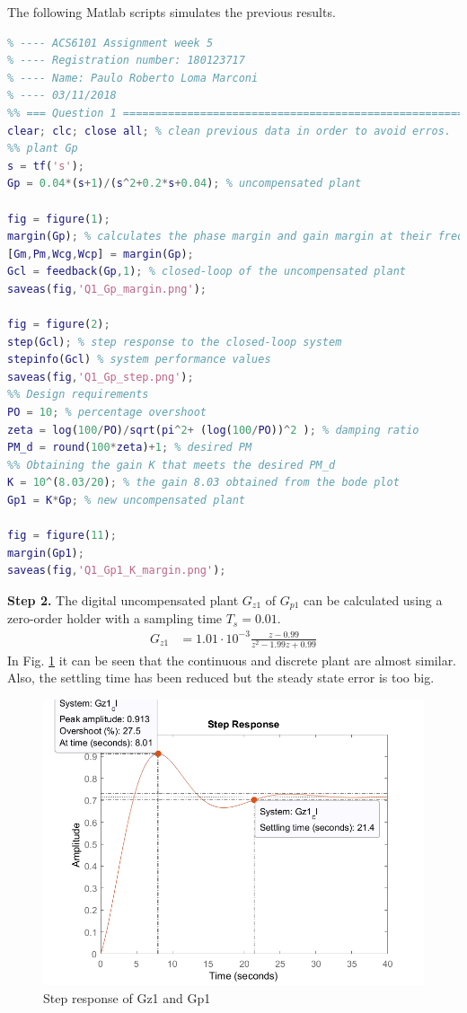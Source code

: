 \documentclass[11pt, a4paper]{article}
\begin{document}
The following Matlab scripts simulates the previous results.
\begin{lstlisting}[language=matlab, caption={}, label={}]
%% ========================================================================
% ---- ACS6101 Assignment week 5
% ---- Registration number: 180123717
% ---- Name: Paulo Roberto Loma Marconi
% ---- 03/11/2018
%% === Question 1 =========================================================
clear; clc; close all; % clean previous data in order to avoid erros.
%% plant Gp 
s = tf('s');
Gp = 0.04*(s+1)/(s^2+0.2*s+0.04); % uncompensated plant

fig = figure(1); 
margin(Gp); % calculates the phase margin and gain margin at their frequencies
[Gm,Pm,Wcg,Wcp] = margin(Gp);
Gcl = feedback(Gp,1); % closed-loop of the uncompensated plant
saveas(fig,'Q1_Gp_margin.png');

fig = figure(2);
step(Gcl); % step response to the closed-loop system
stepinfo(Gcl) % system performance values
saveas(fig,'Q1_Gp_step.png');
%% Design requirements
PO = 10; % percentage overshoot
zeta = log(100/PO)/sqrt(pi^2+ (log(100/PO))^2 ); % damping ratio
PM_d = round(100*zeta)+1; % desired PM
%% Obtaining the gain K that meets the desired PM_d
K = 10^(8.03/20); % the gain 8.03 obtained from the bode plot
Gp1 = K*Gp; % new uncompensated plant

fig = figure(11);
margin(Gp1);
saveas(fig,'Q1_Gp1_K_margin.png');
\end{lstlisting}

\textbf{Step 2.} The digital uncompensated plant $G_{z1}$ of $G_{p1}$ can be calculated using a zero-order holder with a sampling time $T_s=0.01$.
\begin{align}
G_{z1} &= 1.01\cdot10^{-3}\frac{z-0.99}{z^2-1.99z+0.99}
\end{align} 
In Fig. \ref{fig:Q1_Gz1_K_step} it can be seen that the continuous and discrete plant are almost similar. Also, the settling time has been reduced but the steady state error is too big.

\begin{figure}[H]
	\centering
	\includegraphics[width=0.48\linewidth]{../Q1_Gpz_K_step_a.png}
	\caption{Step response of Gz1 and Gp1}
	\label{fig:Q1_Gz1_K_step}
\end{figure}
\end{document}
